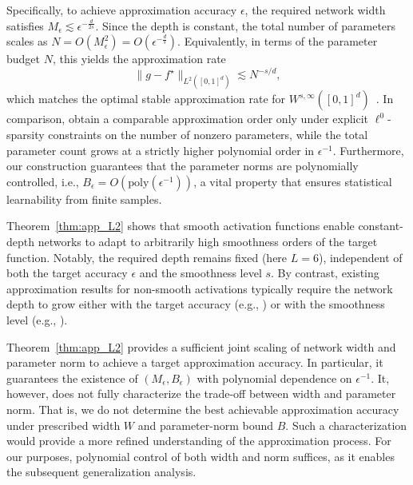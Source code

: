 \documentclass[11pt]{article}
\begin{document}
Specifically, to achieve approximation accuracy $\epsilon$, the required network width satisfies 
$M_\epsilon \lesssim \epsilon^{-\frac{d}{2s}}$. 
Since the depth is constant, the total number of parameters scales as 
$N = O(M_\epsilon^2) = O(\epsilon^{-\frac{d}{s}})$. 
Equivalently, in terms of the parameter budget $N$, this yields the approximation rate
\[
\|g - f^\star\|_{L^2([0,1]^d)} \lesssim N^{-s/d},
\]
which matches the optimal stable approximation rate for $W^{s,\infty}([0,1]^d)$~\citep{devore1998nonlinear}. In comparison, \citet{de2021approximation} obtain a comparable approximation order only under explicit $\ell^0$-sparsity constraints on the number of nonzero parameters, while the total parameter count grows at a strictly higher polynomial order in $\epsilon^{-1}$. Furthermore, our construction guarantees that the parameter norms are polynomially controlled, i.e., $B_\epsilon = O(\mathrm{poly}(\epsilon^{-1}))$, a vital property that ensures statistical learnability from finite samples.


\begin{remark}
Theorem~\ref{thm:app_L2} shows that smooth activation functions enable constant-depth networks to adapt to arbitrarily high smoothness orders of the target function. Notably, the required depth remains fixed (here $L=6$), independent of both the target accuracy $\epsilon$ and the smoothness level $s$.
By contrast, existing approximation results for non-smooth activations typically require the network depth to grow either with the target accuracy (e.g., \citet{yarotsky2017error}) or with the smoothness level (e.g., \citet{petersen2018optimal,lu2021deep}).
\end{remark}


\begin{remark}
Theorem~\ref{thm:app_L2} provides a sufficient joint scaling of network width and parameter norm to achieve a target approximation accuracy. In particular, it guarantees the existence of $(M_\epsilon, B_\epsilon)$ with polynomial dependence on $\epsilon^{-1}$.
It, however, does not fully characterize the trade-off between width and parameter norm. That is, we do not determine the best achievable approximation accuracy under prescribed width $W$ and parameter-norm bound $B$. Such a characterization would provide a more refined understanding of the approximation process. For our purposes, polynomial control of both width and norm suffices, as it enables the subsequent generalization analysis.
\end{remark}
\end{document}
